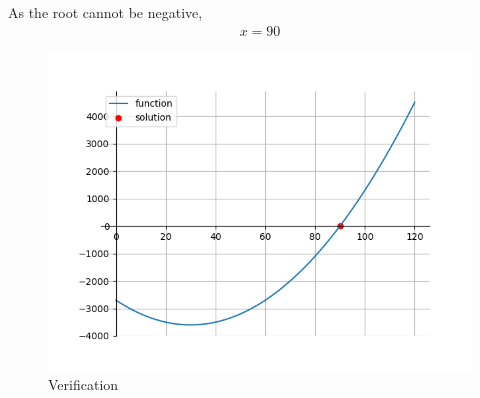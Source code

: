 \documentclass[journal]{IEEEtran}
\begin{document}
As the root cannot be negative,
\begin{align}
    x = 90
\end{align}


    \begin{figure}[ht]  
        \centering  
        \includegraphics[width=\columnwidth]{figs/fig1.png}  
        \caption{Verification}
    \end{figure}
\end{document}
